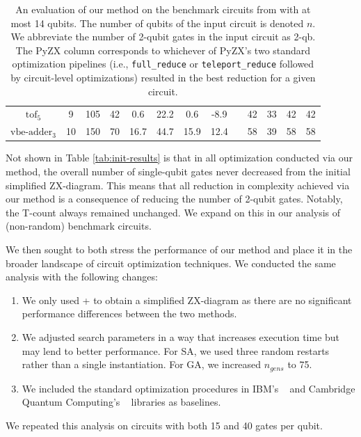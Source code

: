 \begin{table}[t]
\begin{tabular}{@{}ccccccccccccc@{}}
$\text{tof}_5$               & 9  & 105  & 42  & 0.6  & 22.2  & 0.6  & -8.9  &  & 42  & 33  & 42  & 42  \\
$\text{vbe-adder}_3$         & 10 & 150  & 70  & 16.7 & 44.7  & 15.9 & 12.4  &  & 58  & 39  & 58  & 58  \\ \bottomrule
\end{tabular}
\caption{\label{tab:bench}
  An evaluation of our method on the benchmark circuits from \cite{kissinger2019reducing} with at most 14 qubits.
  The number of qubits of the input circuit is denoted $n$.
  We abbreviate the number of 2-qubit gates in the input circuit as 2-qb.
  The PyZX column corresponds to whichever of PyZX's two standard optimization pipelines (i.e., {\color{gray}\texttt{full\_reduce}} or {\color{gray}\texttt{teleport\_reduce}} followed by circuit-level optimizations) resulted in the best reduction for a given circuit.
}
\end{table}



Not shown in Table \ref{tab:init-results} is that in all optimization conducted via our method, the overall number of single-qubit gates never decreased from the initial simplified ZX-diagram.
This means that all reduction in complexity achieved via our method is a consequence of reducing the number of 2-qubit gates.
Notably, the T-count always remained unchanged.
We expand on this in our analysis of (non-random) benchmark circuits.


We then sought to both stress the performance of our method and place it in the broader landscape of circuit optimization techniques.
We conducted the same analysis with the following changes:
\begin{enumerate}
\item
  We only used  +  to obtain a simplified ZX-diagram as there are no significant performance differences between the two methods.
\item
  We adjusted search parameters in a way that increases execution time but may lend to better performance.
  For SA, we used three random restarts rather than a single instantiation.
  For GA, we increased $n_{gens}$ to 75.
\item
  We included the standard optimization procedures in IBM's ~\cite{Qiskit} and Cambridge Quantum Computing's ~\cite{sivarajah2020t} libraries as baselines.
\end{enumerate}
We repeated this analysis on circuits with both 15 and 40 gates per qubit.

